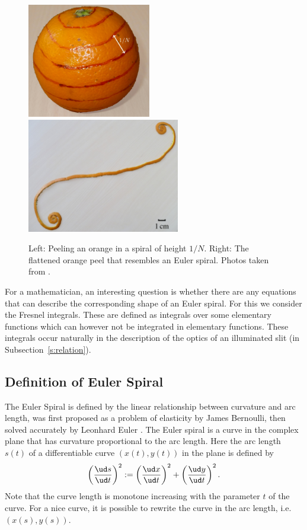 \documentclass[12pt]{article}
\newcommand\udfrac[2]{\ensuremath{\frac{\ud#1}{\ud #2}}}
\begin{document}
\begin{figure}[h!]
	\centering
	\includegraphics[height=5cm]{orange.jpg} \hfill
	\includegraphics[height=5cm]{orangePeel.jpg}
	\label{f:orangePeel}
	\caption{Left: Peeling an orange in a spiral of height $1/N$.
		Right: The flattened orange peel that resembles an Euler spiral.  Photos taken from \cite{BH12}.
	}
\end{figure}

For a mathematician, an interesting question is whether there are any equations that can describe the corresponding shape of an Euler spiral. For this we consider the Fresnel integrals.  These are defined as integrals over some elementary functions which can however not be integrated in elementary functions.  These integrals occur naturally in the description of the optics of an illuminated slit (in Subsection~\ref{s:relation}).


\subsection{Definition of Euler Spiral}
The Euler Spiral is defined by the  linear relationship between curvature and arc length, was
first proposed as a problem of elasticity by James Bernoulli, then solved accurately by Leonhard Euler \cite{Lev08}.
The Euler spiral is a curve in the complex plane that has curvature proportional to the arc length.  Here the arc length $s(t)$ of a differentiable curve $(x(t),y(t))$ in the plane is defined by
\[  \left(\udfrac{s}{t}\right)^2 := \left(\udfrac{x}{t}\right)^2 +\left(\udfrac{y}{t}\right)^2.
\]  Note that the curve length is monotone increasing with the parameter $t$ of the curve.  For a nice curve, it is possible to rewrite the curve in the arc length, i.e.~$(x(s),y(s))$.
\end{document}
